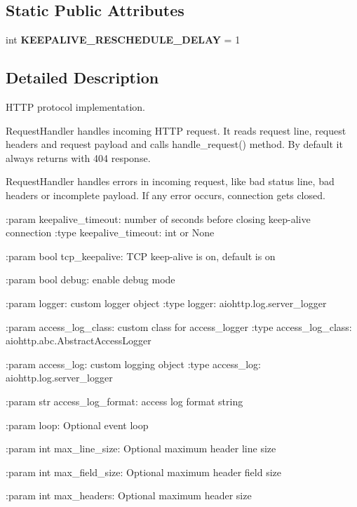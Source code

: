 \subsection*{Static Public Attributes}
\begin{DoxyCompactItemize}
\item 
\mbox{\label{classaiohttp_1_1web__protocol_1_1_request_handler_af9e1d1c11b137c1b0f21aef5010ca079}} 
int {\bfseries K\+E\+E\+P\+A\+L\+I\+V\+E\+\_\+\+R\+E\+S\+C\+H\+E\+D\+U\+L\+E\+\_\+\+D\+E\+L\+AY} = 1
\end{DoxyCompactItemize}


\subsection{Detailed Description}
\begin{DoxyVerb}HTTP protocol implementation.

RequestHandler handles incoming HTTP request. It reads request line,
request headers and request payload and calls handle_request() method.
By default it always returns with 404 response.

RequestHandler handles errors in incoming request, like bad
status line, bad headers or incomplete payload. If any error occurs,
connection gets closed.

:param keepalive_timeout: number of seconds before closing
                          keep-alive connection
:type keepalive_timeout: int or None

:param bool tcp_keepalive: TCP keep-alive is on, default is on

:param bool debug: enable debug mode

:param logger: custom logger object
:type logger: aiohttp.log.server_logger

:param access_log_class: custom class for access_logger
:type access_log_class: aiohttp.abc.AbstractAccessLogger

:param access_log: custom logging object
:type access_log: aiohttp.log.server_logger

:param str access_log_format: access log format string

:param loop: Optional event loop

:param int max_line_size: Optional maximum header line size

:param int max_field_size: Optional maximum header field size

:param int max_headers: Optional maximum header size\end{DoxyVerb}
 

